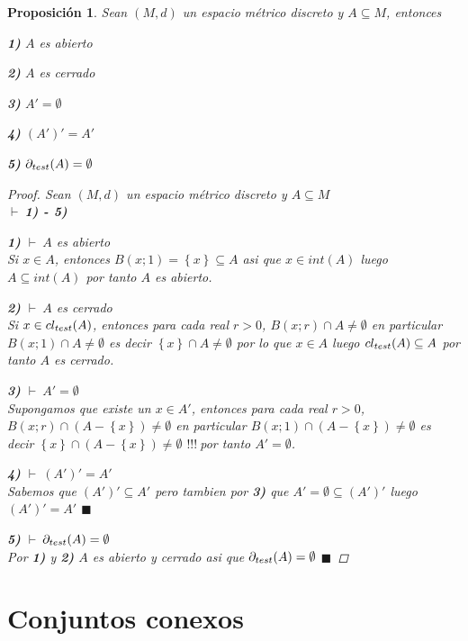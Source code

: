 \documentclass[oneside]{book} %
\theoremstyle{Teorema}
\newtheorem{Proposicion}[Definicion]{Proposición}
\theoremstyle{Ejemplos}
\theoremstyle{[Obs]}
\def \test {test}
\newcommand{\cerradura}[2][\test]{\ifx \test #1 {\overline{#2}} \else {cl_{#1}(#2)} \fi} %
\newcommand{\frontera}[2][\test]{\ifx \test #1 {\partial(#2)} \else {\partial_{#1}(#2)} \fi} %
\renewcommand{\{}{\left\lbrace} %
\renewcommand{\}}{\right\rbrace} %
\newcommand{\n}{\cap} %
\renewcommand{\sc}{\subseteq} %
\renewcommand{\qed}{$\blacksquare$} %
\newcommand{\pd}{$\vdash\ $} %
\renewcommand{\c}{$!!!\ $} %
\begin{document}
			\begin{Proposicion}\setlength{\parindent}{0em}
			
				Sean $(M, d)$ un espacio métrico discreto y $A \sc M$, entonces 
				
				\textbf{1)} $A$ es abierto 

				\textbf{2)} $A$ es cerrado 

				\textbf{3)} $A' = \emptyset$

				\textbf{4)} $(A')' = A'$

				\textbf{5)} $\frontera{A} = \emptyset$
			
				\begin{proof}
					
					Sean $(M, d)$ un espacio métrico discreto y $A \sc M$ \\ 
					\pd \textbf{1) - 5)}
					
					\textbf{1)} \pd $A$ es abierto \\ 
					Si $x \in A$, entonces $B(x;1) = \{ x \} \sc A$ asi que $x \in int(A)$ luego $A \sc int(A)$ por tanto $A$ es abierto.
					
					\textbf{2)} \pd $A$ es cerrado \\ 
					Si $x \in \cerradura{A}$, entonces para cada real $r > 0$, $B(x;r) \n A \neq \emptyset$ en particular $B(x;1) \n A \neq \emptyset$ es decir $\{ x \} \n A \neq \emptyset$ por lo que $x \in A$ luego $\cerradura{A} \sc A$ por tanto $A$ es cerrado.

					\textbf{3)} \pd $A' = \emptyset$ \\ 
					Supongamos que existe un $x \in A'$, entonces para cada real $r > 0$, $B(x;r) \n (A - \{ x \}) \neq \emptyset$ en particular $B(x;1) \n (A - \{ x \}) \neq \emptyset$ es decir $\{ x \} \n (A - \{ x \}) \neq \emptyset$ \c por tanto $A' = \emptyset$.
					
					\textbf{4)} \pd $(A')' = A'$ \\ 
					Sabemos que $(A')' \sc A'$ pero tambien por \textbf{3)} que $A' = \emptyset \sc (A')'$ luego $(A')' = A'$ \qed

					\textbf{5)} \pd $\frontera{A} = \emptyset$ \\ 
					Por \textbf{1)} y \textbf{2)} $A$ es abierto y cerrado asi que $\frontera{A} = \emptyset$ \qed

				\end{proof}

			\end{Proposicion}

	\chapter{Conjuntos conexos}
\end{document}
